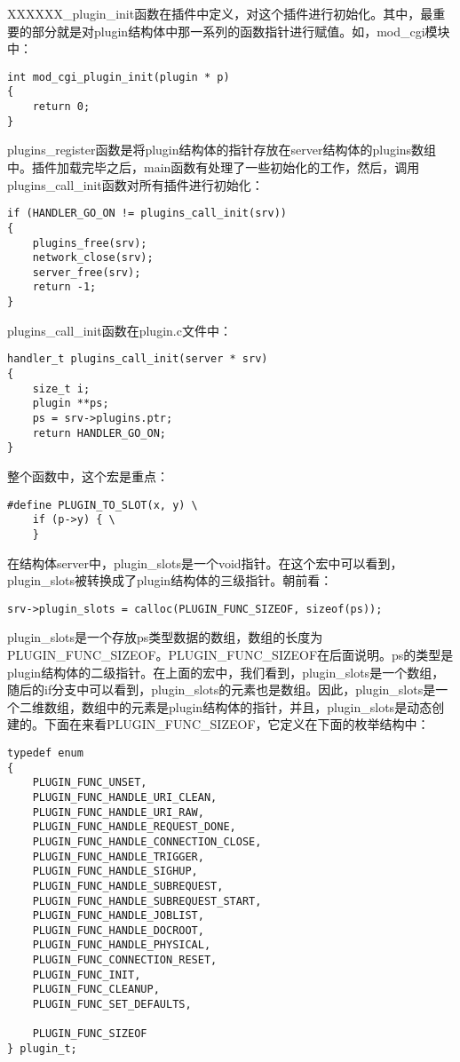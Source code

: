 \documentclass[12pt, a4paper, dvipdfm]{book}
\begin{document}
XXXXXX\_plugin\_init函数在插件中定义，对这个插件进行初始化。其中，最重要的部分就是对plugin结构体中那一系列的函数指针进行赋值。如，mod\_cgi模块中：

\begin{verbatim}
int mod_cgi_plugin_init(plugin * p)
{
	return 0;
}
\end{verbatim}


plugins\_register函数是将plugin结构体的指针存放在server结构体的plugins数组中。插件加载完毕之后，main函数有处理了一些初始化的工作，然后，调用plugins\_call\_init函数对所有插件进行初始化：

\begin{verbatim}
if (HANDLER_GO_ON != plugins_call_init(srv)) 
{
	plugins_free(srv);
	network_close(srv);
	server_free(srv);
	return -1;
}
\end{verbatim}


plugins\_call\_init函数在plugin.c文件中：

\begin{verbatim}
handler_t plugins_call_init(server * srv)
{
	size_t i;
	plugin **ps;
	ps = srv->plugins.ptr;
	return HANDLER_GO_ON;
}
\end{verbatim}

整个函数中，这个宏是重点：

\begin{verbatim}
#define PLUGIN_TO_SLOT(x, y) \
	if (p->y) { \
	}
\end{verbatim}

在结构体server中，plugin\_slots是一个void指针。在这个宏中可以看到，plugin\_slots被转换成了plugin结构体的三级指针。朝前看：

\begin{verbatim}
srv->plugin_slots = calloc(PLUGIN_FUNC_SIZEOF, sizeof(ps));
\end{verbatim}

plugin\_slots是一个存放ps类型数据的数组，数组的长度为\\PLUGIN\_FUNC\_SIZEOF。PLUGIN\_FUNC\_SIZEOF在后面说明。ps的类型是plugin结构体的二级指针。在上面的宏中，我们看到，plugin\_slots是一个数组，随后的if分支中可以看到，plugin\_slots的元素也是数组。因此，plugin\_slots是一个二维数组，数组中的元素是plugin结构体的指针，并且，plugin\_slots是动态创建的。下面在来看PLUGIN\_FUNC\_SIZEOF，它定义在下面的枚举结构中：

\begin{verbatim}
typedef enum 
{
	PLUGIN_FUNC_UNSET,
	PLUGIN_FUNC_HANDLE_URI_CLEAN,
	PLUGIN_FUNC_HANDLE_URI_RAW,
	PLUGIN_FUNC_HANDLE_REQUEST_DONE,
	PLUGIN_FUNC_HANDLE_CONNECTION_CLOSE,
	PLUGIN_FUNC_HANDLE_TRIGGER,
	PLUGIN_FUNC_HANDLE_SIGHUP,
	PLUGIN_FUNC_HANDLE_SUBREQUEST,
	PLUGIN_FUNC_HANDLE_SUBREQUEST_START,
	PLUGIN_FUNC_HANDLE_JOBLIST,
	PLUGIN_FUNC_HANDLE_DOCROOT,
	PLUGIN_FUNC_HANDLE_PHYSICAL,
	PLUGIN_FUNC_CONNECTION_RESET,
	PLUGIN_FUNC_INIT,
	PLUGIN_FUNC_CLEANUP,
	PLUGIN_FUNC_SET_DEFAULTS,

	PLUGIN_FUNC_SIZEOF
} plugin_t;
\end{verbatim}
\end{document}
